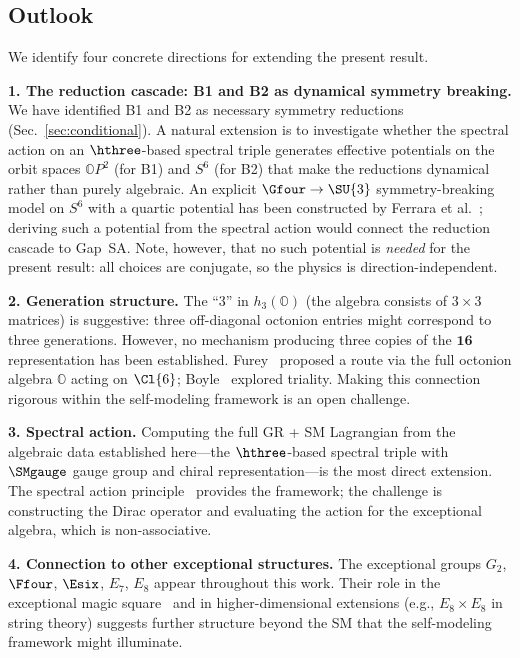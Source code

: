 \subsection{Outlook}\label{sec:outlook}

We identify four concrete directions for extending the present result.

\medskip
\noindent\textbf{1. The reduction cascade: B1 and B2 as dynamical symmetry breaking.}
We have identified B1 and B2 as necessary symmetry reductions
(Sec.~\ref{sec:conditional}).  A natural extension is to
investigate whether the spectral action on an $\hthree$-based
spectral triple generates effective potentials on the orbit spaces
$\mathbb{O}P^2$ (for B1) and $S^6$ (for B2) that make the
reductions dynamical rather than purely algebraic.  An explicit
$\Gfour\to\SU{3}$ symmetry-breaking model on $S^6$ with a quartic
potential has been constructed by Ferrara et
al.~\cite{FerraraEtAl2021}; deriving such a potential from the
spectral action would connect the reduction cascade to Gap~SA.  Note, however, that no such potential is
\emph{needed} for the present result: all choices are
conjugate, so the physics is direction-independent.

\medskip
\noindent\textbf{2. Generation structure.}
The ``3'' in $h_3(\mathbb{O})$ (the algebra consists of
$3\times 3$ matrices) is suggestive: three off-diagonal octonion
entries might correspond to three generations.  However, no mechanism
producing three copies of the $\mathbf{16}$ representation has been
established.  Furey~\cite{Furey2018} proposed a route via the full
octonion algebra $\mathbb{O}$ acting on $\Cl{6}$; Boyle~\cite{Boyle2020}
explored triality.  Making this connection rigorous within the
self-modeling framework is an open challenge.

\medskip
\noindent\textbf{3. Spectral action.}
Computing the full GR + SM Lagrangian from the algebraic data
established here---the $\hthree$-based spectral triple with
$\SMgauge$ gauge group and chiral representation---is the most
direct extension.  The spectral action
principle~\cite{CCM2007} provides the framework; the challenge is
constructing the Dirac operator and evaluating the action for the
exceptional algebra, which is non-associative.

\medskip
\noindent\textbf{4. Connection to other exceptional structures.}
The exceptional groups $G_2$, $\Ffour$, $\Esix$, $E_7$, $E_8$
appear throughout this work.  Their role in the exceptional magic
square~\cite{Baez2002} and in higher-dimensional extensions (e.g.,
$E_8\times E_8$ in string theory) suggests further structure beyond
the SM that the self-modeling framework might illuminate.

